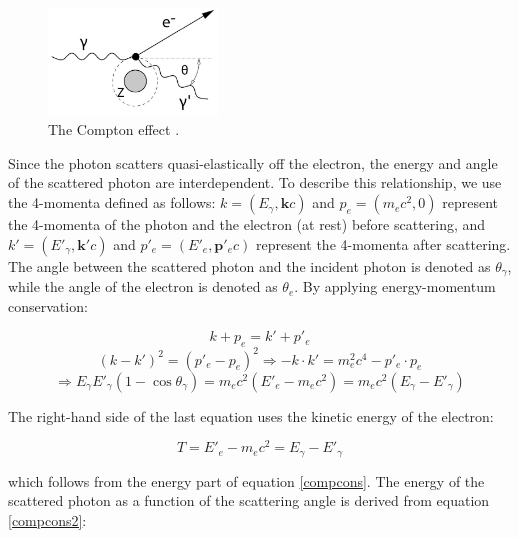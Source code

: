 \begin{figure}[!h]
    \centering
    \includegraphics[width =0.4\textwidth]{figures/png/Screenshot_20240812_204345.png}
    \caption[The Compton effect.]{
    The Compton effect \cite{kola}.}
    \label{fig:compt}
\end{figure}

Since the photon scatters quasi-elastically off the electron, 
the energy and angle of the scattered photon are interdependent. 
To describe this relationship, we use the 4-momenta defined as 
follows: $k = (E_\gamma, \mathbf{k}c)$ and $p_e = (m_e c^2, 0)$ 
represent the 4-momenta of the photon and the electron (at rest) 
before scattering, and $k' = (E'_\gamma, \mathbf{k}'c)$ and 
$p'_e = (E'_e, \mathbf{p}'_e c)$ represent the 4-momenta 
after scattering. The angle between the scattered photon and 
the incident photon is denoted as $\theta_\gamma$, while the 
angle of the electron is denoted as $\theta_e$. By applying 
energy-momentum conservation:

\begin{equation}\label{compcons}
k + p_e = k' + p'_e
\end{equation}
\begin{equation}\label{compcons2}
(k - k')^2 = (p'_e - p_e)^2 \Rightarrow -k \cdot k' = m_e^2 c^4 - p'_e \cdot p_e
\end{equation}
\begin{equation}
\Rightarrow E_\gamma E'_\gamma (1 - \cos \theta_\gamma) = m_e c^2 \left(E'_e - m_e c^2\right) = m_e c^2 \left(E_\gamma - E'_\gamma \right)
\end{equation}

The right-hand side of the last equation uses the kinetic energy of the electron:

\begin{equation}
T = E'_e - m_e c^2 = E_\gamma - E'_\gamma
\end{equation}

which follows from the energy part of equation \ref{compcons}. 
The energy of the scattered photon as a function of the scattering 
angle is derived from equation \ref{compcons2}:

